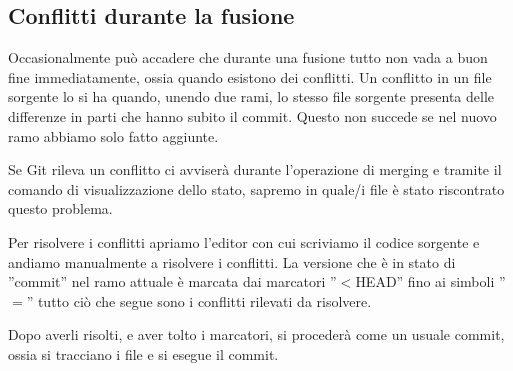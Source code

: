 \subsection{Conflitti durante la fusione}
Occasionalmente può accadere che durante una fusione tutto non vada a buon fine immediatamente, ossia quando esistono dei conflitti. Un conflitto in un file sorgente lo si ha quando, unendo due rami, lo stesso file sorgente presenta delle differenze in parti che hanno subito il commit. Questo non succede se nel nuovo ramo abbiamo solo fatto aggiunte.

Se Git rileva un conflitto ci avviserà durante l'operazione di merging e tramite il comando di visualizzazione dello stato, sapremo in quale/i file è stato riscontrato questo problema.

Per risolvere i conflitti apriamo l'editor con cui scriviamo il codice sorgente e andiamo manualmente a risolvere i conflitti. La versione che è in stato di ''commit'' nel ramo attuale è marcata dai marcatori ''$<$HEAD'' fino ai simboli ''$=$'' tutto ciò che segue sono i conflitti rilevati da risolvere.

Dopo averli risolti, e aver tolto i marcatori, si procederà come un usuale commit, ossia si tracciano i file e si esegue il commit.
